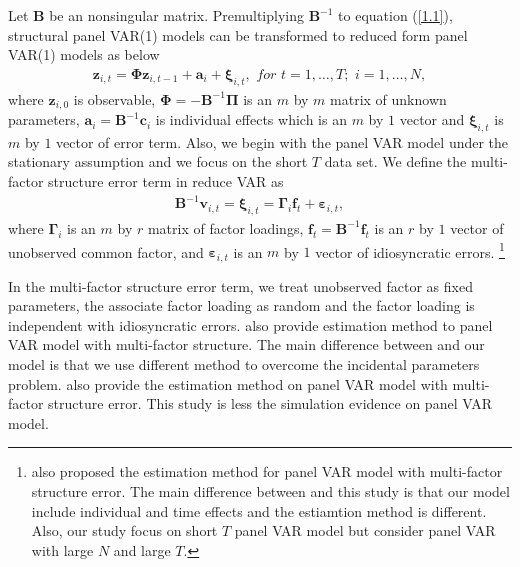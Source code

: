 \documentclass[12pt,a4paper,hyperref]{article}
\begin{document}
Let $\boldsymbol{B}$ be an nonsingular matrix. Premultiplying $\boldsymbol{B}^{-1}$ to equation (\ref{1.1}),  structural panel VAR(1) models can be transformed to  reduced form panel VAR(1) models as below
\begin{align}
\boldsymbol{z}_{i,t}=\boldsymbol{\Phi} \boldsymbol{z}_{i,t-1}+\boldsymbol{a}_{i}+ \boldsymbol{\xi}_{i,t}, \,\, for \,\, t=1,\ldots, T;\,\,i=1,\ldots,N, \label{1}
\end{align}
where $\boldsymbol{z}_{i,0}$ is observable, $\boldsymbol{\Phi}=-\boldsymbol{B}^{-1}\boldsymbol{\Pi}$ is an $m$ by $m$ matrix of unknown parameters, $\boldsymbol{a}_{i}=\boldsymbol{B}^{-1}\boldsymbol{c}_{i}$ is individual effects which is an $m$ by $1$ vector  and $\boldsymbol{\xi}_{i,t}$ is $m$ by $1$ vector of error term.  Also, we begin with  the panel VAR model under the stationary assumption  and we focus on the short $T$ data set.
We define the multi-factor structure error term in reduce VAR as
\begin{align}
\boldsymbol{B}^{-1}\boldsymbol{v}_{i,t}=\boldsymbol{\xi}_{i,t}=\boldsymbol{\Gamma}_{i}\boldsymbol{f}_{t}+\boldsymbol{\varepsilon}_{i,t}, \label{2}
\end{align}
where  $\boldsymbol{\Gamma}_{i}$ is an $m$ by $r$ matrix of factor loadings, $\boldsymbol{f}_{t}=\boldsymbol{B}^{-1}\boldsymbol{f}_{t}$ is an $r$ by $1$ vector of unobserved common factor, and $\boldsymbol{\varepsilon}_{i,t}$ is an $m$ by $1$ vector of idiosyncratic errors. \footnote{ \citet{Huang:2008} also proposed  the estimation method for panel VAR model with multi-factor structure error. The main difference between \citet{Huang:2008} and this study is that our model include individual and time effects and the estiamtion method is different. Also, our study focus on short $T$ panel VAR model but \citet{Huang:2008} consider panel VAR with large $N$ and large $T$.}



In the multi-factor structure error term, we treat unobserved factor as fixed parameters, the associate factor loading as random and the factor loading is independent with idiosyncratic errors.
 \citet{Bai:2013} also provide estimation method to panel VAR model with multi-factor structure. The main difference between  \citet{Bai:2013} and our model is that we use different method to overcome the incidental parameters problem. \citet{Moon:2017} also provide the estimation method on panel VAR model with multi-factor structure error. This study is less the simulation evidence on panel VAR model.
\end{document}
